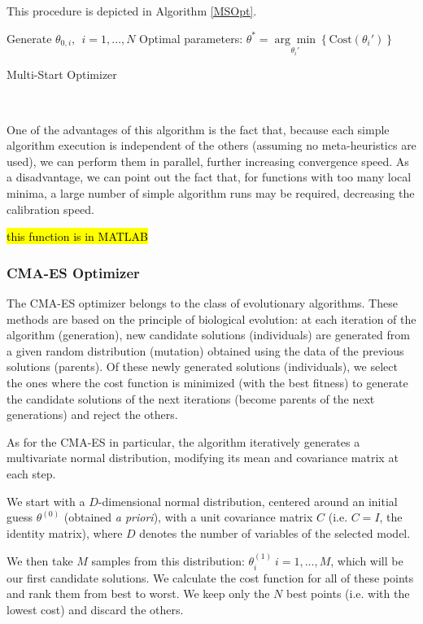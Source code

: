 This procedure is depicted in Algorithm \ref{MSOpt}.

\begin{algorithm}[H]\label{MSOpt}
\DontPrintSemicolon
Generate $\theta_{0,i},\ \ i=1,\ldots,N$
 Optimal parameters: $\theta^{*}=\underset{\theta_i'}{\arg\min}\left\{\mathrm{Cost}(\theta_i')\right\}$\;
 \caption{Multi-Start Optimizer}
\end{algorithm}
\ 

One of the advantages of this algorithm is the fact that, because each simple algorithm execution is independent of the others (assuming no meta-heuristics are used), we can perform them in parallel, further increasing convergence speed.
As a disadvantage, we can point out the fact that, for functions with too many local minima, a large number of simple algorithm runs may be required, decreasing the calibration speed.

\hl{this function is in MATLAB}

\subsubsection{CMA-ES Optimizer}
The CMA-ES optimizer belongs to the class of evolutionary algorithms. These methods are based on the principle of biological evolution: at each iteration of the algorithm (generation), new candidate solutions (individuals) are generated from a given random distribution (mutation) obtained using the data of the previous solutions (parents). Of these newly generated solutions (individuals), we select the ones where the cost function is minimized (with the best fitness) to generate the candidate solutions of the next iterations (become parents of the next generations) and reject the others.

As for the CMA-ES in particular, the algorithm iteratively generates a multivariate normal distribution, modifying its mean and covariance matrix at each step.

We start with a $D$-dimensional normal distribution, centered around an initial guess $\theta^{(0)}$ (obtained \textit{a priori}), with a unit covariance matrix $C$ (i.e. $C=I$, the identity matrix), where $D$ denotes the number of variables of the selected model.

We then take $M$ samples from this distribution: $\theta^{(1)}_i\ i=1,\ldots,M$, which will be our first candidate solutions. We calculate the cost function for all of these points and rank them from best to worst. We keep only the $N$ best points (i.e. with the lowest cost) and discard the others.

